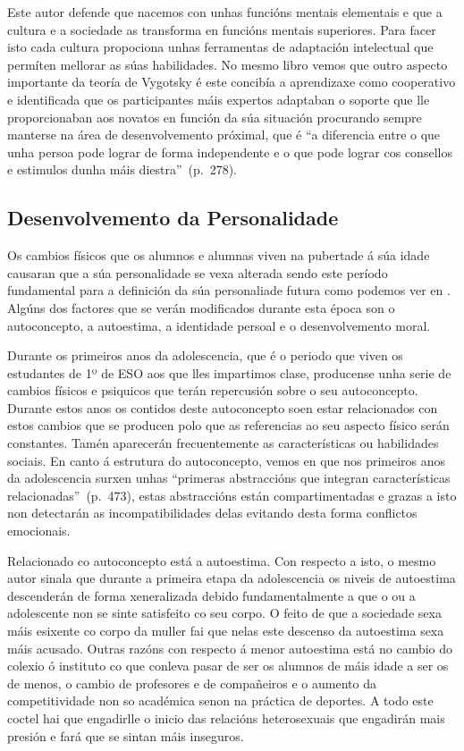 Este autor defende que nacemos con unhas funcións mentais elementais e que a cultura e a sociedade as transforma en funcións mentais superiores. Para facer isto cada cultura propociona unhas ferramentas de adaptación intelectual que permíten mellorar as súas habilidades. No mesmo libro vemos que outro aspecto importante da teoría de Vygotsky é este concibía a aprendizaxe como cooperativo e identificada que os participantes máis expertos adaptaban o soporte que lle proporcionaban aos novatos en función da súa situación procurando sempre manterse na área de desenvolvemento próximal, que é ``a diferencia entre o que unha persoa pode lograr de forma independente e o que pode lograr cos consellos e estimulos dunha máis diestra''~(p.~278).

\subsection{Desenvolvemento da Personalidade}
Os cambios físicos que os alumnos e alumnas viven na pubertade á súa idade causaran que a súa personalidade se vexa alterada sendo este período fundamental para a definición da súa personaliade futura como podemos ver en . Algúns dos factores que se verán modificados durante esta época son o autoconcepto, a autoestima, a identidade persoal e o desenvolvemento moral.

Durante os primeiros anos da adolescencia, que é o periodo que viven os estudantes de 1º de ESO aos que lles impartimos clase, producense unha serie de cambios físicos e psiquicos que terán repercusión sobre o seu autoconcepto. Durante estos anos os contidos deste autoconcepto soen estar relacionados con estos cambios que se producen polo que as referencias ao seu aspecto físico serán constantes. Tamén aparecerán frecuentemente as características ou habilidades sociais. En canto á estrutura do autoconcepto, vemos en  que nos primeiros anos da adolescencia surxen unhas ``primeras abstraccións que integran características relacionadas''~(p.~473), estas abstraccións están compartimentadas e grazas a isto non detectarán as incompatibilidades delas evitando desta forma conflictos emocionais.

Relacionado co autoconcepto está a autoestima. Con respecto a isto, o mesmo autor sinala que durante a primeira etapa da adolescencia os niveis de autoestima descenderán de forma xeneralizada debido fundamentalmente a que o ou a adolescente non se sinte satisfeito co seu corpo. O feito de que a sociedade sexa máis esixente co corpo da muller fai que nelas este descenso da autoestima sexa máis acusado. Outras razóns con respecto á menor autoestima está no cambio do colexio ó instituto co que conleva pasar de ser os alumnos de máis idade a ser os de menos, o cambio de profesores e de compañeiros e o aumento da competitividade non so académica senon na práctica de deportes. A todo este coctel hai que engadirlle o inicio das relacións heterosexuais que engadirán mais presión e fará que se sintan máis inseguros.

